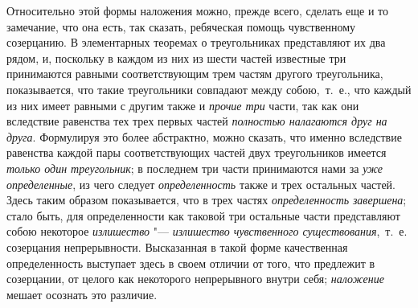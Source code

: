 {Относительно этой формы наложения можно, прежде всего, сделать еще и то
замечание, что она есть, так сказать, ребяческая помощь чувственному
созерцанию. В элементарных теоремах о треугольниках представляют их два
рядом, и, поскольку в каждом из них из шести частей известные три
принимаются равными соответствующим трем частям другого треугольника,
показывается, что такие треугольники совпадают между собою,~т.~е., что
каждый из них имеет равными с другим также и
{\em прочие три} части, так как они вследствие
равенства тех трех первых частей {\em полностью
налагаются друг на друга}. Формулируя это более абстрактно, можно сказать,
что именно вследствие равенства каждой пары соответствующих частей двух
треугольников имеется {\em только один треугольник}; в
последнем три части принимаются нами за {\em уже
определенные}, из чего следует {\em определенность}
также и трех остальных частей. Здесь таким образом показывается, что в трех
частях {\em определенность}
{\em завершена}; стало быть, для определенности как
таковой три остальные части представляют собою некоторое
{\em излишество} "--- {\em излишество
чувственного существования},~т.~е. созерцания непрерывности. Высказанная в
такой форме качественная определенность выступает здесь в своем отличии от
того, что предлежит в созерцании, от целого как некоторого непрерывного
внутри себя; {\em наложение} мешает осознать это
различие.

}
